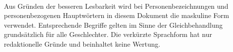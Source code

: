 \\
Aus Gründen der besseren Lesbarkeit wird bei Personenbezeichnungen und personenbezogenen Hauptwörtern in diesem Dokument die maskuline Form verwendet. Entsprechende Begriffe gelten im Sinne der Gleichbehandlung grundsätzlich für alle Geschlechter. Die verkürzte Sprachform hat nur redaktionelle Gründe und beinhaltet keine Wertung.
\newpage
